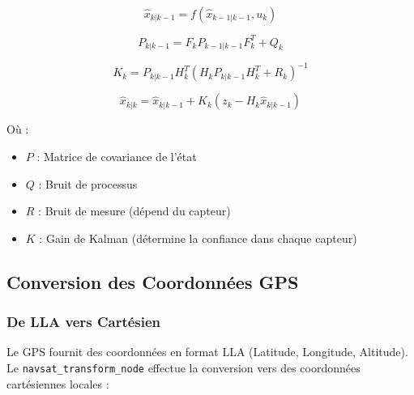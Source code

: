 \documentclass[a4paper,12pt]{article}
\begin{document}
\begin{equation}
\hat{x}_{k|k-1} = f(\hat{x}_{k-1|k-1}, u_k)
\end{equation}

\begin{equation}
P_{k|k-1} = F_k P_{k-1|k-1} F_k^T + Q_k
\end{equation}

\begin{equation}
K_k = P_{k|k-1} H_k^T (H_k P_{k|k-1} H_k^T + R_k)^{-1}
\end{equation}

\begin{equation}
\hat{x}_{k|k} = \hat{x}_{k|k-1} + K_k (z_k - H_k \hat{x}_{k|k-1})
\end{equation}

Où :
\begin{itemize}
    \item $P$ : Matrice de covariance de l'état
    \item $Q$ : Bruit de processus
    \item $R$ : Bruit de mesure (dépend du capteur)
    \item $K$ : Gain de Kalman (détermine la confiance dans chaque capteur)
\end{itemize}

\subsection{Conversion des Coordonnées GPS}

\subsubsection{De LLA vers Cartésien}

Le GPS fournit des coordonnées en format LLA (Latitude, Longitude, Altitude). Le \texttt{navsat\_transform\_node} effectue la conversion vers des coordonnées cartésiennes locales :
\end{document}
